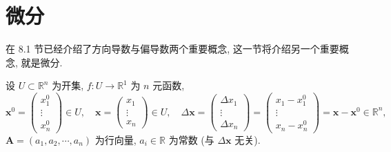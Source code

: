 
\section{微分}\label{sec:8.2}

在 8.1 节已经介绍了方向导数与偏导数两个重要概念, 这一节将介绍另一个重要概念, 就是微分.

\begin{definition}\label{def:8.2.1}
设 $U \subset \mathbb{R}^{n}$ 为开集, $f: U \to \mathbb{R}^{1}$ 为 $n$ 元函数,
\[
  \boldsymbol{x}^{0} = \begin{pmatrix} x_{1}^{0} \\ \vdots \\ x_{n}^{0} \end{pmatrix} \in U, \quad
  \boldsymbol{x} = \begin{pmatrix} x_{1} \\ \vdots \\ x_{n} \end{pmatrix} \in U, \quad
  \Delta\boldsymbol{x} = \begin{pmatrix} \Delta x_{1} \\ \vdots \\ \Delta x_{n} \end{pmatrix}
  = \begin{pmatrix} x_{1} - x_{1}^{0} \\ \vdots \\ x_{n} - x_{n}^{0} \end{pmatrix}
  = \boldsymbol{x} - \boldsymbol{x}^{0} \in \mathbb{R}^{n},
\]
$\boldsymbol{A} = (a_{1}, a_{2}, \cdots, a_{n})$ 为行向量, $a_{i} \in \mathbb{R}$ 为常数 (与 $\Delta\boldsymbol{x}$ 无关).


\end{definition}
